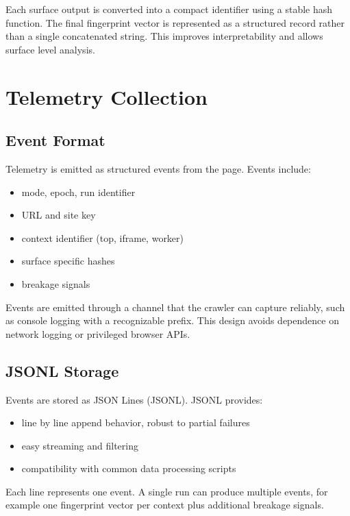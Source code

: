 \documentclass[11pt]{report}
\begin{document}
Each surface output is converted into a compact identifier using a stable hash function. The final fingerprint vector is represented as a structured record rather than a single concatenated string. This improves interpretability and allows surface level analysis.

\section{Telemetry Collection}

\subsection{Event Format}

Telemetry is emitted as structured events from the page. Events include:

\begin{itemize}
    \item mode, epoch, run identifier
    \item URL and site key
    \item context identifier (top, iframe, worker)
    \item surface specific hashes
    \item breakage signals
\end{itemize}

Events are emitted through a channel that the crawler can capture reliably, such as console logging with a recognizable prefix. This design avoids dependence on network logging or privileged browser APIs.

\subsection{JSONL Storage}

Events are stored as JSON Lines (JSONL). JSONL provides:

\begin{itemize}
    \item line by line append behavior, robust to partial failures
    \item easy streaming and filtering
    \item compatibility with common data processing scripts
\end{itemize}

Each line represents one event. A single run can produce multiple events, for example one fingerprint vector per context plus additional breakage signals.
\end{document}
